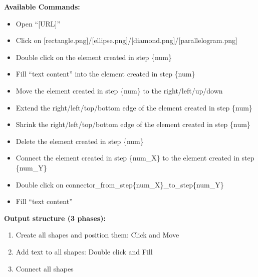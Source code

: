 \documentclass[a4paper, 12pt]{report}
\begin{document}
{\begin{tcolorbox}[
    colback=gray!10,
    colframe=gray!50!black,
    title=Nội dung prompt,
    fonttitle=\bfseries,
    coltitle=white,
    colbacktitle=gray!50!black,
    before skip=5pt,
    after skip=5pt
]
\vspace{0.2cm}
\textbf{Available Commands:}
\begin{itemize}[nosep, leftmargin=*] %
    \item Open ``[URL]''
    \item Click on [rectangle.png]/[ellipse.png]/[diamond.png]/[parallelogram.png]
    \item Double click on the element created in step \{num\}
    \item Fill ``text content'' into the element created in step \{num\}
    \item Move the element created in step \{num\} to the right/left/up/down
    \item Extend the right/left/top/bottom edge of the element created in step \{num\}
    \item Shrink the right/left/top/bottom edge of the element created in step \{num\}
    \item Delete the element created in step \{num\}
    \item Connect the element created in step \{num\_X\} to the element created in step \{num\_Y\}
    \item Double click on connector\_from\_step\{num\_X\}\_to\_step\{num\_Y\}
    \item Fill ``text content''
\end{itemize}

\vspace{0.2cm}
\textbf{Output structure (3 phases):}
\begin{enumerate}[nosep, leftmargin=*]
    \item Create all shapes and position them: Click and Move
    \item Add text to all shapes: Double click and Fill
    \item Connect all shapes
\end{enumerate}


\end{tcolorbox}}
\end{document}
